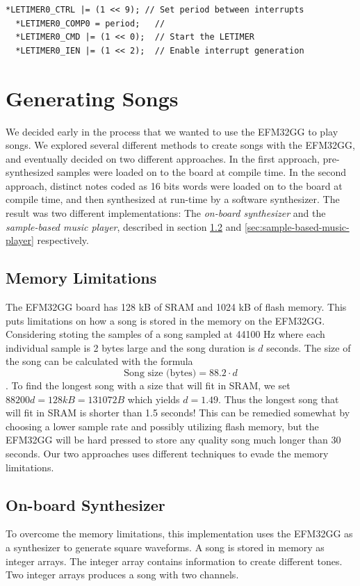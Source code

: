 \noindent\begin{minipage}[c]{\textwidth}
  \begin{lstlisting}[caption=Setting up LETIMER to generate periodic interrupts,label={lst:letimer-setup}]
  *LETIMER0_CTRL |= (1 << 9); // Set period between interrupts
  *LETIMER0_COMP0 = period;   // 
  *LETIMER0_CMD |= (1 << 0);  // Start the LETIMER
  *LETIMER0_IEN |= (1 << 2);  // Enable interrupt generation
  \end{lstlisting}
\end{minipage}


\section{Generating Songs}
We decided early in the process that we wanted to use the EFM32GG to play songs. We explored several different methods to create songs with the EFM32GG, and eventually decided on two different approaches. In the first approach, pre-synthesized samples were loaded on to the board at compile time. In the second approach, distinct notes coded as 16 bits words were loaded on to the board at compile time, and then synthesized at run-time by a software synthesizer. The result was two different implementations: The \emph{on-board synthesizer} and the \emph{sample-based music player}, described in section \ref{sec:onboard-synthesizer} and \ref{sec:sample-based-music-player} respectively.

\subsection{Memory Limitations}
The EFM32GG board has 128 kB of SRAM and 1024 kB of flash memory. This puts limitations on how a song is stored in the memory on the EFM32GG. Considering stoting the samples of a song sampled at 44100 Hz where each individual sample is 2 bytes large and the song duration is $d$ seconds. The size of the song can be calculated with the formula
$$\text{Song size (bytes)} = 88.2 \cdot d$$.
To find the longest song with a size that will fit in SRAM, we set $88200d = 128 kB = 131072 B$ which yields $d = 1.49$. Thus the longest song that will fit in SRAM is shorter than 1.5 seconds! This can be remedied somewhat by choosing a lower sample rate and possibly utilizing flash memory, but the EFM32GG will be hard pressed to store any quality song much longer than 30 seconds. Our two approaches uses different techniques to evade the memory limitations.

\subsection{On-board Synthesizer}\label{sec:onboard-synthesizer}
To overcome the memory limitations, this implementation uses the EFM32GG as a synthesizer to generate square waveforms. A song is stored in memory as integer arrays. The integer array contains information to create different tones. Two integer arrays produces a song with two channels.

